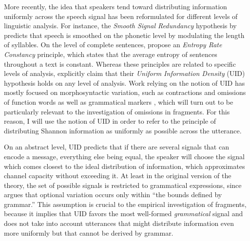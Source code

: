 More recently, the idea that speakers tend toward distributing information uniformly across the speech signal has been reformulated for different levels of linguistic analysis. For instance, the \textit{Smooth Signal Redundancy} hypothesis by \citet{aylett.turk2004} predicts that speech is smoothed on the phonetic level by modulating the length of syllables. On the level of complete sentences, \citet{genzel.charniak2002, genzel.charniak2003} propose an \textit{Entropy Rate Constancy} principle, which states that the average entropy of sentences throughout a text is constant. Whereas these principles are related to specific levels of analysis, \citet[24]{levy.jaeger2007} explicitly claim that their \textit{Uniform Information Density} (UID) hypothesis holds on any level of analysis. Work relying on the notion of UID has mostly focused on morphosyntactic variation, such as contractions \citep{frank.jaeger2008} and omissions of function words \citep{levy.jaeger2007, jaeger2010} as well as grammatical markers \citep{kurumada.jaeger2015, norcliffe.jaeger2016}, which will turn out to be particularly relevant to the investigation of omissions in fragments. For this reason, I will use the notion of UID in order to refer to the principle of distributing Shannon information as uniformly as possible across the utterance.

On an abstract level, UID predicts that if there are several signals that can encode a message, everything else being equal, the speaker will choose the signal which comes closest to the ideal distribution of information, which approximates channel capacity without exceeding it. At least in the original version of the theory, the set of possible signals is restricted to grammatical expressions, since \citet[25]{jaeger2010} argues that optional variation occurs only within ``the bounds defined by grammar.'' This assumption is crucial to the empirical investigation of fragments, because it implies that UID favors the most well-formed \textit{grammatical} signal and does not take into account utterances that might distribute information even more uniformly but that cannot be derived by grammar.

